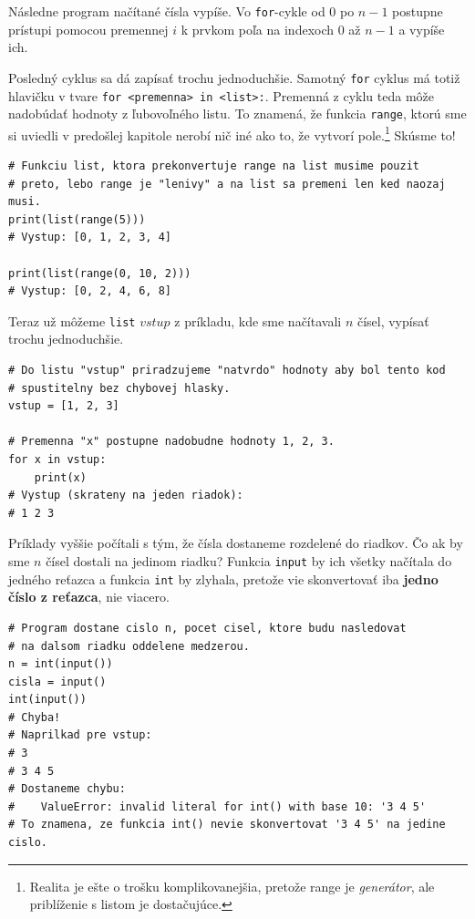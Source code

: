 \documentclass{article}
\begin{document}
Následne program načítané čísla vypíše. Vo \texttt{for}-cykle od $0$ po $n - 1$ postupne prístupi pomocou premennej $i$ k prvkom poľa na indexoch $0$ až $n - 1$ a vypíše ich.

Posledný cyklus sa dá zapísať trochu jednoduchšie. Samotný \texttt{for} cyklus má totiž hlavičku v tvare \texttt{for <premenna> in <list>:}. Premenná z cyklu teda môže nadobúdať hodnoty z ľubovoľného listu. To znamená, že funkcia \texttt{range}, ktorú sme si uviedli v predošlej kapitole nerobí nič iné ako to, že vytvorí pole.\footnote{Realita je ešte o trošku komplikovanejšia, pretože range je \textit{generátor}, ale priblíženie s listom je dostačujúce.} Skúsme to!
\begin{lstlisting}
# Funkciu list, ktora prekonvertuje range na list musime pouzit
# preto, lebo range je "lenivy" a na list sa premeni len ked naozaj musi.
print(list(range(5)))
# Vystup: [0, 1, 2, 3, 4]

print(list(range(0, 10, 2)))
# Vystup: [0, 2, 4, 6, 8]
\end{lstlisting}

Teraz už môžeme \texttt{list} $vstup$ z príkladu, kde sme načítavali $n$ čísel, vypísať trochu jednoduchšie.
\begin{lstlisting}
# Do listu "vstup" priradzujeme "natvrdo" hodnoty aby bol tento kod
# spustitelny bez chybovej hlasky.
vstup = [1, 2, 3]

# Premenna "x" postupne nadobudne hodnoty 1, 2, 3.
for x in vstup:
    print(x)
# Vystup (skrateny na jeden riadok):
# 1 2 3
\end{lstlisting}

Príklady vyššie počítali s tým, že čísla dostaneme rozdelené do riadkov. Čo ak by sme $n$ čísel dostali na jedinom riadku? Funkcia \texttt{input} by ich všetky načítala do jedného reťazca a funkcia \texttt{int} by zlyhala, pretože vie skonvertovať iba \textbf{jedno číslo z reťazca}, nie viacero.
\begin{lstlisting}
# Program dostane cislo n, pocet cisel, ktore budu nasledovat
# na dalsom riadku oddelene medzerou.
n = int(input())
cisla = input()
int(input())
# Chyba!
# Naprilkad pre vstup:
# 3
# 3 4 5
# Dostaneme chybu:
#    ValueError: invalid literal for int() with base 10: '3 4 5'
# To znamena, ze funkcia int() nevie skonvertovat '3 4 5' na jedine cislo.
\end{lstlisting}
\end{document}
